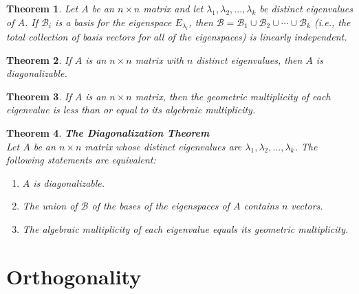 \documentclass{article}
\theoremstyle{sltheorem}
\newtheorem{theorem}{Theorem}[section]
\begin{document}
\begin{theorem}
    Let $A$ be an $n\times n$ matrix and let $\lambda_1, \lambda_2, ..., \lambda_k$ be distinct eigenvalues of $A$. If $\mathcal{B}_i$ is a basis for the eigenspace $E_{\lambda_i}$, then $\mathcal{B} = \mathcal{B}_1\cup\mathcal{B}_2\cup\cdots\cup\mathcal{B}_k$ (i.e., the total collection of basis vectors for all of the eigenspaces) is linearly independent.
\end{theorem}
\begin{theorem}
    If $A$ is an $n\times n$ matrix with $n$ distinct eigenvalues, then $A$ is diagonalizable.
\end{theorem}
\begin{theorem}
    If $A$ is an $n\times n$ matrix, then the geometric multiplicity of each eigenvalue is less than or equal to its algebraic multiplicity.
\end{theorem}
\begin{theorem}
    \textbf{The Diagonalization Theorem}\\
    Let $A$ be an $n\times n$ matrix whose distinct eigenvalues are $\lambda_1, \lambda_2, ...,\lambda_k$. The following statements are equivalent:
    \begin{enumerate}
        \item $A$ is diagonalizable.
        \item The union of $\mathcal{B}$ of the bases of the eigenspaces of $A$ contains $n$ vectors.
        \item The algebraic multiplicity of each eigenvalue equals its geometric multiplicity.
    \end{enumerate}

\end{theorem}
\section{Orthogonality}
\end{document}
